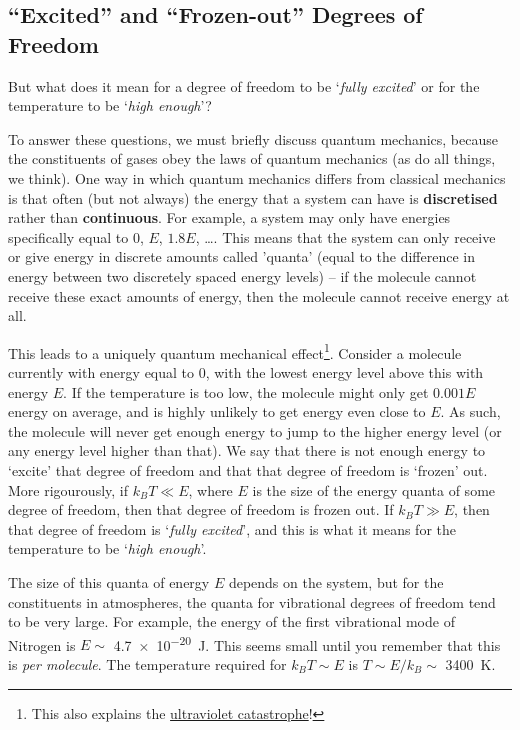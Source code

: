 \subsection{``Excited'' and ``Frozen-out'' Degrees of Freedom}

But what does it mean for a degree of freedom to be `\textit{fully excited}' or for the temperature to be `\textit{high enough}'? 

To answer these questions, we must briefly discuss quantum mechanics, because the constituents of gases obey the laws of quantum mechanics (as do all things, we think). One way in which quantum mechanics differs from classical mechanics is that often (but not always) the energy that a system can have is \textbf{discretised} rather than \textbf{continuous}. For example, a system may only have energies specifically equal to \(0\), \(E\), \(1.8E\), \ldots. This means that the system can only receive or give energy in discrete amounts called 'quanta' (equal to the difference in energy between two discretely spaced energy levels) – if the molecule cannot receive these exact amounts of energy, then the molecule cannot receive energy at all.

This leads to a uniquely quantum mechanical effect\footnote{
    This also explains the \href{https://en.wikipedia.org/wiki/Ultraviolet_catastrophe}{ultraviolet catastrophe}!
}. Consider a molecule currently with energy equal to \(0\), with the lowest energy level above this with energy \(E\). If the temperature is too low, the molecule might only get \(0.001E\) energy on average, and is highly unlikely to get energy even close to \(E\). As such, the molecule will never get enough energy to jump to the higher energy level (or any energy level higher than that). We say that there is not enough energy to `excite' that degree of freedom and that that degree of freedom is `frozen' out. More rigourously, if \(k_BT\ll E\), where \(E\) is the size of the energy quanta of some degree of freedom, then that degree of freedom is frozen out. If \(k_BT\gg E\), then that degree of freedom is `\textit{fully excited}', and this is what it means for the temperature to be `\textit{high enough}'.

The size of this quanta of energy \(E\) depends on the system, but for the constituents in atmospheres, the quanta for vibrational degrees of freedom tend to be very large. For example, the energy of the first vibrational mode of Nitrogen is \(E\sim\) \qty{4.7e-20}{\joule}. This seems small until you remember that this is \textit{per molecule}. The temperature required for \(k_BT\sim E\) is \(T\sim E/k_B\sim\) \qty{3400}{\kelvin}.

